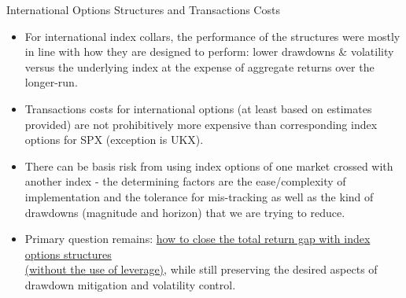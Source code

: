 \documentclass{beamer}
\begin{document}
\begin{frame}{International Options Structures and Transactions Costs}
\begin{itemize}
\item For international index collars, the {\color {blue} performance of the structures were mostly in line with how they are designed to perform}: lower drawdowns \& volatility versus the underlying index at the expense of aggregate returns over the longer-run.

\item Transactions costs for international options (at least based on estimates provided) are {\color {blue} not prohibitively more expensive than corresponding index options for SPX} (exception is UKX).

\item There can be basis risk from using index options of one market crossed with another index - the determining factors are the ease/complexity of implementation and the tolerance for mis-tracking as well as the kind of drawdowns (magnitude and horizon) that we are trying to reduce.

\item Primary question remains: \underline {how to close the total return gap with index options structures} \\ \underline {(without the use of leverage)}, while still preserving the desired aspects of drawdown mitigation and volatility control.
\end{itemize}
\end{frame}
\end{document}
